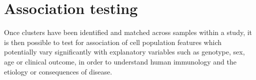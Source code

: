 
%
%


\section{Association testing}

Once clusters have been identified and matched across samples within a study, it is then possible to test for association of cell population
features which potentially vary significantly with explanatory variables such as genotype, sex, age or clinical outcome,
in order to understand human immunology and the etiology or consequences of disease.

